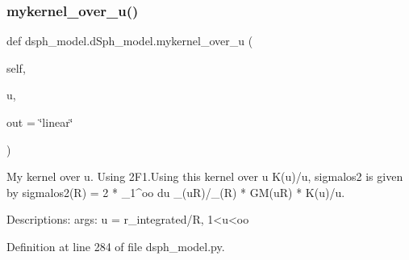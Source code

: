 \subsubsection{\texorpdfstring{mykernel\+\_\+over\+\_\+u()}{mykernel\_over\_u()}}
{\footnotesize\ttfamily def dsph\+\_\+model.\+d\+Sph\+\_\+model.\+mykernel\+\_\+over\+\_\+u (\begin{DoxyParamCaption}\item[{}]{self,  }\item[{}]{u,  }\item[{}]{out = {\ttfamily \char`\"{}linear\char`\"{}} }\end{DoxyParamCaption})}

\begin{DoxyVerb}My kernel over u. Using 2F1.Using this kernel over u K(u)/u, sigmalos2 is given by
    sigmalos2(R) = 2 * \int_1^oo du \Sigma_\ast(uR)/\nu_\ast(R) * GM(uR) * K(u)/u.
    
Descriptions:
    args: u = r_integrated/R, 1<u<oo
\end{DoxyVerb}
 

Definition at line 284 of file dsph\+\_\+model.\+py.


